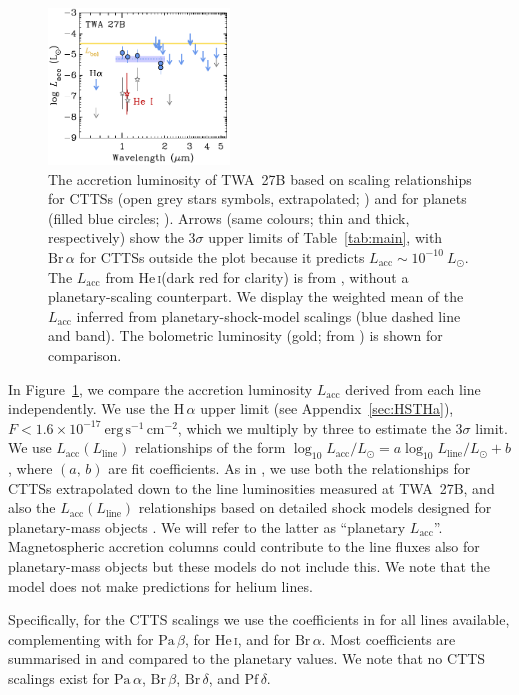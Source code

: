 \documentclass[twocolumn,twocolumnappendix]{aastex631}
\newcommand{\neuI}[1]{{\leavevmode{\boldmath\bfseries#1}}}
\renewcommand{\neuI}[1]{{\leavevmode#1}}
\def\LSonne{\ensuremath{L_\odot}\xspace}           %
\def\Ha{\ensuremath{\mathrm{H}\,\alpha}\xspace}             %
\def\Paa{\ensuremath{\mathrm{Pa}\,\alpha}\xspace}           %
\def\Pab{\ensuremath{\mathrm{Pa}\,\beta}\xspace}            %
\def\Bra{\ensuremath{\mathrm{Br}\,\alpha}\xspace}           %
\def\Brb{\ensuremath{\mathrm{Br}\,\beta}\xspace}            %
\def\Brd{\ensuremath{\mathrm{Br}\,\delta}\xspace}           %
\def\Pfd{\ensuremath{\mathrm{Pf}\,\delta}\xspace}           %
\def\HeI{\ensuremath{\mathrm{He}}\,\textsc{i}\xspace}       %
\def\HeIt{\HeI}                     %
\newcommand{\Lacc}{\ensuremath{{L_{\textrm{acc}}}}\xspace}  %
\def\LAkk{\Lacc}
\def\LLinie{\ensuremath{L_{\textrm{line}}}\xspace}                      %
\def\FEcgs{\ensuremath{\textrm{erg}\,\textrm{s}^{-1}\,\textrm{cm}^{-2}}\xspace}
\def\twb{TWA~27B\xspace}
\begin{document}
\begin{figure}[t]
 \centering
 \includegraphics[width=0.43\textwidth]{more_LAkk.pdf}
\caption{%
The accretion luminosity of \twb based on scaling relationships for CTTSs (open grey stars symbols, extrapolated; \citealp{salyk13,alcal17})
and for planets (filled blue circles; \citealp{AMIM21L,ma22}).
Arrows (same colours; thin and thick, respectively) show the $3\sigma$ upper limits of Table~\ref{tab:main},
with \Bra for CTTSs \citep{Komarova+Fischer2020} outside the plot
because it predicts $\LAkk\sim10^{-10}~\LSonne$.
The \LAkk from \HeIt (dark red for clarity) is from \citet{alcal14}, without a planetary-scaling counterpart.
%
We display the weighted mean of the \LAkk inferred from planetary-shock-model scalings (blue dashed line and band). The bolometric luminosity (gold; from \citealt{luhman23c}) is shown for comparison.
%
}
\label{fig:LAkks}
\end{figure}


In Figure~\ref{fig:LAkks}, we compare the accretion luminosity \LAkk derived from each line independently.
We use \neuI{the \Ha upper limit (see Appendix~\ref{sec:HSTHa}),} 
%
%
%
%
%
%
%
%
%
%
%
$F<1.6\times10^{-17}~\FEcgs$, which we multiply by three to estimate the $3\sigma$ limit.
%
We use $\LAkk(\LLinie)$ relationships
\neuI{of the form $\log_{10}\LAkk/\LSonne=a\log_{10}\LLinie/\LSonne+b$, where $(a,\,b)$ are fit coefficients.}
As in \citet{betti22b,betti22c}, we use both
the relationships for CTTSs 
extrapolated down to the line luminosities measured at \twb, %
and also the $\LAkk(\LLinie)$ relationships based on detailed shock models designed for planetary-mass objects \citep{AMIM21L,ma22}. 
%
We will refer to \neuI{the latter} as ``planetary \LAkk''.
Magnetospheric accretion columns could contribute to the line fluxes also for planetary-mass objects but these models do not include this.
We note that the \citet{aoyama18} model does not make predictions for helium lines.  %

\neuI{Specifically, for the CTTS scalings we use the coefficients in \citet{alcal17} for all lines available,
complementing with
\citet{salyk13} for \Pab, \citet{alcal14} for \HeIt, and \citet{Komarova+Fischer2020} for \Bra. Most coefficients are summarised in \citet{AMIM21L} and compared to the planetary values.}
%
We note that no CTTS scalings exist for \Paa, \Brb, \Brd, and \Pfd.
\end{document}
